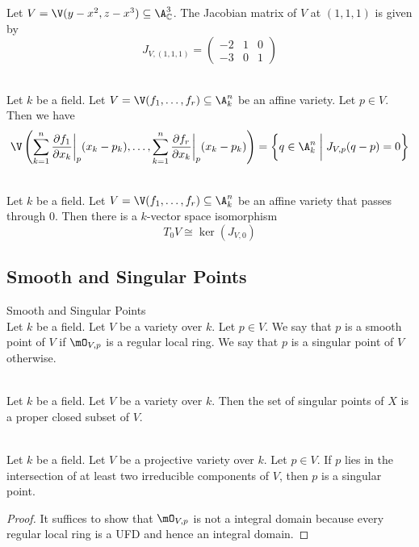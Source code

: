 \documentclass[a4paper]{article}
\begin{document}
\begin{eg}{}{} Let $V=\V(y-x^2,z-x^3)\subseteq\A_\C^3$. The Jacobian matrix of $V$ at $(1,1,1)$ is given by $$J_{V,(1,1,1)}=\begin{pmatrix}
-2 & 1 & 0\\
-3 & 0 & 1
\end{pmatrix}$$
\end{eg}

\begin{lmm}{}{}\\
Let $k$ be a field. Let $V=\V(f_1,\dots,f_r)\subseteq\A_k^n$ be an affine variety. Let $p\in V$. Then we have $$\V\left(\sum_{k=1}^n\frac{\partial f_1}{\partial x_k}\bigg{|}_p(x_k-p_k),\dots,\sum_{k=1}^n\frac{\partial f_r}{\partial x_k}\bigg{|}_p(x_k-p_k)\right)=\left\{q\in\A_k^n\;\bigg{|}\;J_{V,p}(q-p)=0\right\}$$
\end{lmm}

\begin{prp}{}{}\\
Let $k$ be a field. Let $V=\V(f_1,\dots,f_r)\subseteq\A_k^n$ be an affine variety that passes through $0$. Then there is a $k$-vector space isomorphism $$T_0V\cong\ker(J_{V,0})$$
\end{prp}

\subsection{Smooth and Singular Points}
\begin{defn}{Smooth and Singular Points}{}\\
Let $k$ be a field. Let $V$ be a variety over $k$. Let $p\in V$. We say that $p$ is a smooth point of $V$ if $\mO_{V,p}$ is a regular local ring. We say that $p$ is a singular point of $V$ otherwise. 
\end{defn}

\begin{thm}{}{}\\
Let $k$ be a field. Let $V$ be a variety over $k$. Then the set of singular points of $X$ is a proper closed subset of $V$. 
\end{thm}

\begin{lmm}{}{}\\
Let $k$ be a field. Let $V$ be a projective variety over $k$. Let $p\in V$. If $p$ lies in the intersection of at least two irreducible components of $V$, then $p$ is a singular point. 
\begin{proof}
It suffices to show that $\mO_{V,p}$ is not a integral domain because every regular local ring is a UFD and hence an integral domain. 
\end{proof}
\end{lmm}
\end{document}
